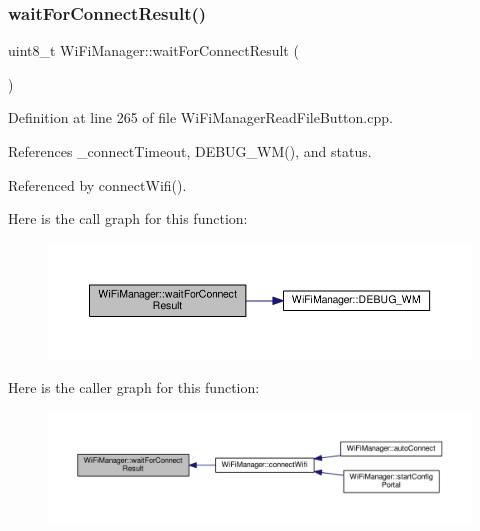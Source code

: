 \subsubsection{\texorpdfstring{wait\+For\+Connect\+Result()}{waitForConnectResult()}}
{\footnotesize\ttfamily uint8\+\_\+t Wi\+Fi\+Manager\+::wait\+For\+Connect\+Result (\begin{DoxyParamCaption}{ }\end{DoxyParamCaption})\hspace{0.3cm}{\ttfamily [private]}}



Definition at line 265 of file Wi\+Fi\+Manager\+Read\+File\+Button.\+cpp.



References \+\_\+connect\+Timeout, D\+E\+B\+U\+G\+\_\+\+W\+M(), and status.



Referenced by connect\+Wifi().

Here is the call graph for this function\+:\nopagebreak
\begin{figure}[H]
\begin{center}
\leavevmode
\includegraphics[width=350pt]{d4/dc8/class_wi_fi_manager_a89a3f33997aa662ad223d6c150c1eede_cgraph}
\end{center}
\end{figure}
Here is the caller graph for this function\+:\nopagebreak
\begin{figure}[H]
\begin{center}
\leavevmode
\includegraphics[width=350pt]{d4/dc8/class_wi_fi_manager_a89a3f33997aa662ad223d6c150c1eede_icgraph}
\end{center}
\end{figure}
\mbox{\label{class_wi_fi_manager_a47e4c7df7478f690c53ff9f5125c9760}} 

